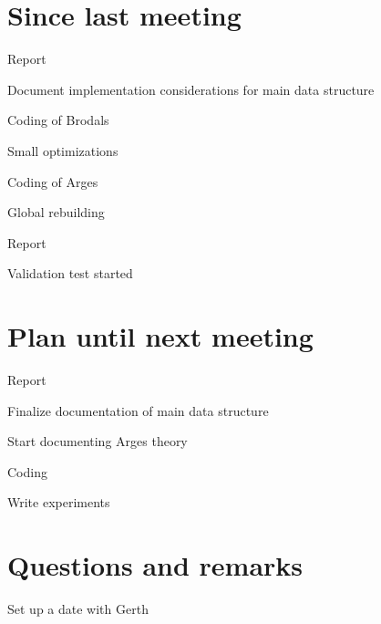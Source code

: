 \documentclass[a4paper,11pt,agenda,chair]{meetingmins}
\begin{document}
\maketitle

\section{Since last meeting}
\begin{items}
\item Report
	\begin{items}
		\item Document implementation considerations for main data structure
	\end{items}
\item Coding of Brodals
	\begin{items}
		\item Small optimizations
	\end{items}
\item Coding of Arges
	\begin{items}
		\item Global rebuilding
		\item Report
		\item Validation test started
	\end{items}
\end{items}

\section{Plan until next meeting}
\begin{items}
\item Report
	\begin{items}
		\item Finalize documentation of main data structure
		\item Start documenting Arges theory
	\end{items}
\item Coding
	\begin{items}
		\item Write experiments
	\end{items}
\end{items}

\section{Questions and remarks}
\begin{items}
	\item Set up a date with Gerth
	
\end{items}
\end{document}
